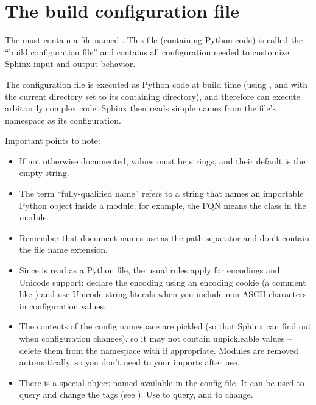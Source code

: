 \documentclass[letterpaper,10pt,english]{sphinxmanual}
\begin{document}
\chapter{The build configuration file}
\label{config::doc}\label{config:build-config}\label{config:module-conf}\label{config:the-build-configuration-file}
The {\hyperref[glossary:term\string-configuration\string-directory]{}} must contain a file named .
This file (containing Python code) is called the ``build configuration file'' and
contains all configuration needed to customize Sphinx input and output behavior.

The configuration file is executed as Python code at build time (using
, and with the current directory set to its containing
directory), and therefore can execute arbitrarily complex code.  Sphinx then
reads simple names from the file's namespace as its configuration.

Important points to note:
\begin{itemize}
\item {} 
If not otherwise documented, values must be strings, and their default is the
empty string.

\item {} 
The term ``fully-qualified name'' refers to a string that names an importable
Python object inside a module; for example, the FQN
 means the  class in the
 module.

\item {} 
Remember that document names use \code{/} as the path separator and don't contain
the file name extension.

\item {} 
Since  is read as a Python file, the usual rules apply for
encodings and Unicode support: declare the encoding using an encoding cookie
(a comment like ) and use Unicode string literals
when you include non-ASCII characters in configuration values.

\item {} 
The contents of the config namespace are pickled (so that Sphinx can find out
when configuration changes), so it may not contain unpickleable values --
delete them from the namespace with  if appropriate.  Modules are
removed automatically, so you don't need to  your imports after use.

\item {} 
There is a special object named  available in the config file.
It can be used to query and change the tags (see {\hyperref[markup/misc:tags]{}}).  Use
 to query,  and 
to change.

\end{itemize}
\end{document}
